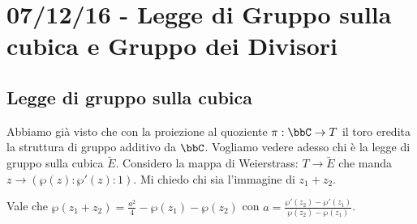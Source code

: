 \chapter{07/12/16 - Legge di Gruppo sulla cubica e Gruppo dei Divisori}
\justify

\section{Legge di gruppo sulla cubica}
Abbiamo già visto che con la proiezione al quoziente $\pi : \bbC \rightarrow T$ il toro eredita la struttura di gruppo additivo da $\bbC$.
Vogliamo vedere adesso chi è la legge di gruppo sulla cubica $\widetilde{E}$.
Considero la mappa di Weierstrass: $T\rightarrow \widetilde{E}$ che manda $z \rightarrow (\wp(z):\wp'(z):1)$. Mi chiedo chi sia l'immagine di $z_1 + z_2$.

\begin{teorema}
Vale che $\wp(z_1+z_2) = \frac{a^2}{4} - \wp(z_1) - \wp(z_2) $
con $a = \frac{\wp'(z_2) - \wp'(z_1)}{\wp(z_2) - \wp(z_1)}$.
\end{teorema}

